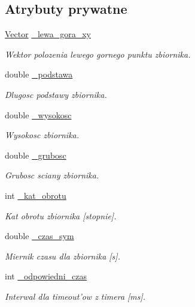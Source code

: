 \subsection*{Atrybuty prywatne}
\begin{DoxyCompactItemize}
\item 
\hyperlink{class_vector}{Vector} \hyperlink{class_zbiornik_aab83049b3afbd20e1f158daf16e17e87}{\-\_\-lewa\-\_\-gora\-\_\-xy}
\begin{DoxyCompactList}\small\item\em Wektor polozenia lewego gornego punktu zbiornika. \end{DoxyCompactList}\item 
double \hyperlink{class_zbiornik_aff57d3fb370566986df4eb58711cbfae}{\-\_\-podstawa}
\begin{DoxyCompactList}\small\item\em Dlugosc podstawy zbiornika. \end{DoxyCompactList}\item 
double \hyperlink{class_zbiornik_abe4d7a4e2d39e802d656b03bb3afdd3f}{\-\_\-wysokosc}
\begin{DoxyCompactList}\small\item\em Wysokosc zbiornika. \end{DoxyCompactList}\item 
double \hyperlink{class_zbiornik_a8a1db6d1edbfaa1a4f84d9717a8c0dfc}{\-\_\-grubosc}
\begin{DoxyCompactList}\small\item\em Grubosc sciany zbiornika. \end{DoxyCompactList}\item 
int \hyperlink{class_zbiornik_a0ec6f5babd42c79bf3f1e7055e8d413e}{\-\_\-kat\-\_\-obrotu}
\begin{DoxyCompactList}\small\item\em Kat obrotu zbiornika \mbox{[}stopnie\mbox{]}. \end{DoxyCompactList}\item 
double \hyperlink{class_zbiornik_a4a30db357e7e7b3ed28acb59db5a86ad}{\-\_\-czas\-\_\-sym}
\begin{DoxyCompactList}\small\item\em Miernik czasu dla zbiornika \mbox{[}s\mbox{]}. \end{DoxyCompactList}\item 
int \hyperlink{class_zbiornik_a14cf0ec861fc38fe40081342ef1e00df}{\-\_\-odpowiedni\-\_\-czas}
\begin{DoxyCompactList}\small\item\em Interwal dla timeout'ow z timera \mbox{[}ms\mbox{]}. \end{DoxyCompactList}\end{DoxyCompactItemize}


